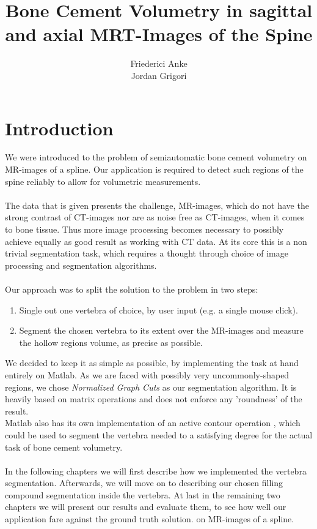 \documentclass{article}
\title{Bone Cement Volumetry in sagittal and axial MRT-Images of the Spine}
\author{Friederici Anke\\ Jordan Grigori}
\begin{document}
  
  \begin{titlepage}
    \centering
    
  \end{titlepage}
  
  \maketitle
  \thispagestyle{empty}
  \pagebreak
  
  \section{Introduction}
  \setcounter{page}{1}
  {
    We were introduced to the problem of semiautomatic bone cement volumetry 
    on MR-images of a spline.
    Our application is required 
    to detect such regions of the spine reliably to allow for volumetric measurements.\\
    \\The data that is given presents the challenge, MR-images, which do not have
    the strong contrast of CT-images nor are as noise free as CT-images, when it
    comes to bone tissue. Thus more image processing becomes necessary to possibly 
    achieve equally as good result as working with CT data.
    At its core this is a non trivial segmentation task, which requires a thought 
    through choice of image processing and segmentation algorithms.\\
    \\Our approach was to split the solution to the problem in two steps:
    \begin{enumerate}
      \item Single out one vertebra of choice, by user input (e.g. a single mouse click).
      \item Segment the chosen vertebra to its extent over the MR-images and measure the hollow regions volume, as precise as possible.
    \end{enumerate}
    We decided to keep it as simple as possible, by implementing the task at hand 
    entirely on Matlab. 
    As we are faced with possibly very uncommonly-shaped regions, we chose \textit{Normalized Graph Cuts} \cite{[ShiMalik00]} as our segmentation algorithm.
    It is heavily based on matrix operations and does not enforce any 'roundness' of the result.
    \\Matlab also has its own implementation of an active contour
    operation \cite{[ChanVese01]}, which could be used to segment the vertebra needed to a satisfying degree for the actual task of bone cement volumetry.\\	
    \\In the following chapters we will first describe how we implemented the vertebra segmentation.
    Afterwards, we will move on to describing our chosen filling compound segmentation inside the vertebra.
    At last in the remaining two chapters we will present our results and evaluate them, to see how well our application fare against the ground truth solution.
    on MR-images of a spline.
  }
  \pagebreak
\end{document}
